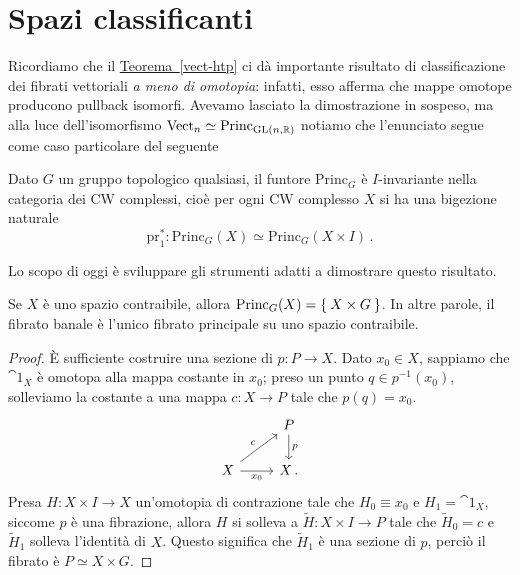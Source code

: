 
\section{Spazi classificanti}


Ricordiamo che il \hyperref[vect-htp]{Teorema~\ref{vect-htp}}
ci dà importante risultato di classificazione dei fibrati vettoriali
\emph{a meno di omotopia}: infatti, esso afferma che 
mappe omotope producono pullback isomorfi.
Avevamo lasciato la dimostrazione in sospeso, 
ma alla luce dell'isomorfismo 
$\mathrm{Vect}_{n} \simeq \mathrm{Princ}_{\mathrm{GL}(n,{\mathbb R})}$
notiamo che l'enunciato segue come caso particolare del seguente
\begin{thm}\label{princ-I-invariante}
	Dato $G$ un gruppo topologico qualsiasi,
	il funtore $\mathrm{Princ}_{G}$ è $I$-invariante nella categoria dei CW complessi, 
	cioè per ogni CW complesso $X$ %
	si ha una bigezione naturale
	\begin{equation*}
		\mathrm{pr}_{1}^{*} : \mathrm{Princ}_{G}(X) \simeq \mathrm{Princ}_{G}(X \times I)\,.
	\end{equation*}
\end{thm}
Lo scopo di oggi è sviluppare gli strumenti adatti a dimostrare questo risultato.

\begin{lemma}\label{contraibile-banale}
	Se $X$ è uno spazio contraibile, allora $\mathrm{Princ}_{G}(X) = \Set{X \times G}$.
	In altre parole, il fibrato banale è l'unico fibrato principale su uno spazio contraibile.
	\begin{proof}
		 È sufficiente costruire una sezione di $p:P \to X$.
			Dato $x_{0} \in X$, sappiamo che $\cat{1}_{X}$ è omotopa alla mappa costante in $x_{0}$;
			preso un punto $q \in p^{-1}(x_{0})$, solleviamo la costante a una mappa $c:X \to P$
			tale che $p(q)=x_{0}$.
			\begin{equation*}
				\begin{tikzcd}
					& P \ar[d, "p"] \\
					X \ar[r, "x_{0}"'] \ar[ur, "c"] & X\,.
				\end{tikzcd}
			\end{equation*}
			Presa $H: X \times I \to X$ un'omotopia di contrazione tale che
			 $H_{0} \equiv x_{0}$ e $H_{1} = \cat{1}_{X}$, 
			 siccome $p$ è una fibrazione, 
			 allora $H$ si solleva a $\widetilde{H} : X \times I \to P$ tale
			 che $\widetilde{H}_{0}=c$ e $\widetilde{H}_{1}$ solleva l'identità di $X$.
			 Questo significa che $\widetilde{H}_{1}$ è una sezione di $p$,
			 perciò il fibrato è $P \simeq X \times G$. 
	\end{proof}
\end{lemma}

